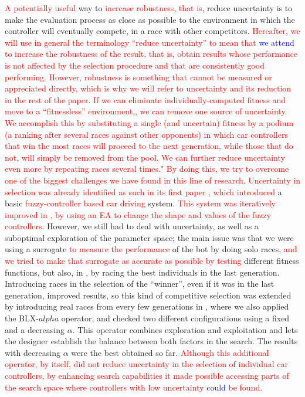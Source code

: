 \documentclass[10pt,journal,compsoc]{IEEEtran}
\begin{document}
\textcolor{red}{A potentially useful} way to \textcolor{red}{increase robustness, that
is, }reduce uncertainty is to make the evaluation process
as close as possible to the environment in which the controller will
eventually compete, in a race with other competitors. \textcolor{red}{Hereafter, we will use in general the
  terminology ``reduce uncertainty'' to mean that \textcolor{blue}{we attend} to increase the robustness of the result, that is, obtain results whose
  performance is not affected by the selection procedure and that are
  consistently good performing. However, robustness is something that
  cannot be measured or appreciated directly, which is why we will
  refer to uncertainty and its reduction in the rest of the paper}.
\textcolor{red}{
	If we can eliminate \textcolor{red}{individually-computed} fitness and move to a ``fitnessless'' environment,, we can remove one source of uncertainty. We accomplish this by substituting a single (and uncertain) fitness  by a podium (a ranking after several races against other opponents) 
	in which car controllers that win the most races will proceed to the next generation, while those that do not, will simply be removed from the pool. We can further reduce uncertainty even more by repeating
	races several times."}
\textcolor{red}{By doing this, we try to overcome one of the biggest
challenges we have found in this line of research. Uncertainty in
selection was already identified as such in its first paper
\cite{salem_evo17}, which introduced} a basic
\textcolor{red}{fuzzy-controller based car driving}
system. \textcolor{red}{This system was iteratively improved in
\cite{salem_evo18,salem_cig2018}, by using an EA to change the shape
and values of the fuzzy controllers}. However, we still had to deal
with uncertainty, as well as a suboptimal exploration of the parameter
space; the main issue was that we were using a surrogate
\textcolor{red}{to measure the performance} of the bot by doing solo
races, \textcolor{red}{and we tried to make that surrogate as accurate as
  possible by testing} different
fitness functions, but also, in \cite{salem_cig2018}, by racing the best individuals in the last
generation. Introducing
races in the selection of the ``winner'', even if it was in the last
generation, improved results, so this kind of competitive selection
was extended by introducing real races from every few generations in
\cite{DBLP:conf/cig/SalemMG19}, where we also applied the BLX-$alpha$
operator, and checked two different configurations using a fixed and a
decreasing $\alpha$. This operator combines exploration and
exploitation and lets the designer establish the balance between both factors in the search. The
results with decreasing $\alpha$ were the best obtained so
far. \textcolor{red}{Although this additional operator, by itself, did
  not reduce uncertainty in the selection of individual car
  controllers, by enhancing search capabilities it made possible
  accessing parts of the search space where controllers with low
  uncertainty \textcolor{blue}{could} be found}.
\end{document}
